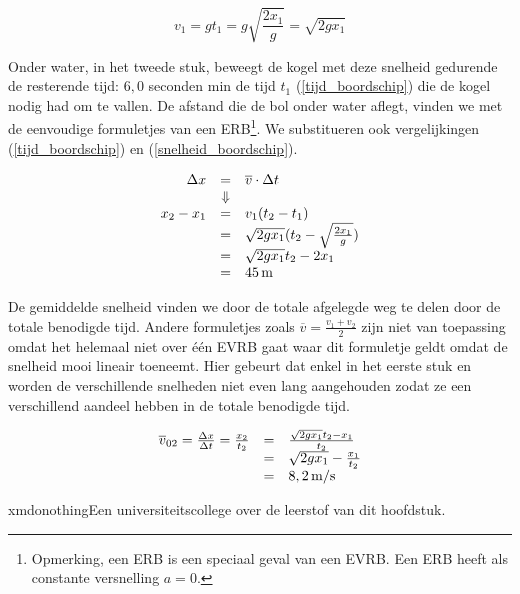 \documentclass{ximera}
\begin{document}
\begin{exercise}
\begin{oplossing}
\[
v_1=gt_1\nonumber=g\sqrt{\frac{2x_1}{g}}\nonumber=\sqrt{2gx_1}
\]

Onder water, in het tweede stuk, beweegt de kogel met deze snelheid gedurende de resterende tijd: $6,0$ seconden min de tijd $t_1$ (\ref{tijd_boordschip}) die de kogel nodig had om te vallen. De afstand die de bol onder water aflegt, vinden we met de eenvoudige formuletjes van een ERB\footnote{Opmerking, een ERB is een speciaal geval van een EVRB. Een ERB heeft als constante versnelling $a=0$.}. We substitueren ook vergelijkingen (\ref{tijd_boordschip}) en (\ref{snelheid_boordschip}).

\[
\begin{array}{rcl}
\Delta x&=&\overline{v}\cdot\Delta t\\
&\Downarrow&\\
x_2-x_1&=&v_1(t_2-t_1)\\
&=&\sqrt{2gx_1}(t_2-\sqrt{\frac{2x_1}{g}})\\
&=&\sqrt{2gx_1}t_2-2x_1\\
&=&45\rm\,m
\end{array}
\]

De gemiddelde snelheid vinden we door de totale afgelegde weg te delen door de totale benodigde tijd. Andere formuletjes zoals $\overline{v}=\frac{v_1+v_2}{2}$ zijn niet van toepassing omdat het helemaal niet over \'e\'en EVRB gaat waar dit formuletje geldt omdat de snelheid mooi lineair toeneemt. Hier gebeurt dat enkel in het eerste stuk en worden de verschillende snelheden niet even lang aangehouden zodat ze een verschillend aandeel hebben in de totale benodigde tijd.

\[
\begin{array}{rcl}
\overline{v}_{02}=\frac{\Delta x}{\Delta t}=\frac{x_2}{t_2}&=&\frac{\sqrt{2gx_1}t_2-x_1}{t_2}\\
&=&\sqrt{2gx_1}-\frac{x_1}{t_2}\\
&=&8,2\rm\,m/s
\end{array}
\]

\end{oplossing}
\end{exercise}

\begin{expandable}{xmdonothing}{Een universiteitscollege over de leerstof van dit hoofdstuk.}
\end{expandable}
\end{document}
